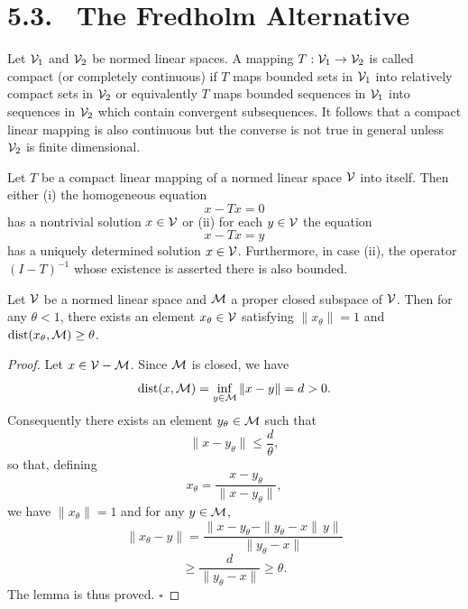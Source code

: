 \section*{5.3. \ The Fredholm Alternative}

\begin{definition}\label{gt.def5.3.compact-mapping}
Let $\mathcal{V}_1$ and $\mathcal{V}_2$ be normed linear spaces. A mapping $T : \mathcal{V}_1 \to \mathcal{V}_2$ is called compact (or completely continuous) if $T$ maps bounded sets in $\mathcal{V}_1$ into relatively compact sets in $\mathcal{V}_2$ or equivalently $T$ maps bounded sequences in $\mathcal{V}_1$ into sequences in $\mathcal{V}_2$ which contain convergent subsequences. It follows that a compact linear mapping is also continuous but the converse is not true in general unless $\mathcal{V}_2$ is finite dimensional.
\end{definition}

\begin{theorem}\label{gt.thm5.3}
Let $T$ be a compact linear mapping of a normed linear space $\mathcal{V}$ into itself. Then either (i) the homogeneous equation
\[
 x - Tx = 0
\]
has a nontrivial solution $x \in \mathcal{V}$ or (ii) for each $y \in \mathcal{V}$ the equation
\[
 x - Tx = y
\]
has a uniquely determined solution $x \in \mathcal{V}$. Furthermore, in case (ii), the operator $(I-T)^{-1}$ whose existence is asserted there is also bounded.
\end{theorem}

\begin{lemma}\label{gt.lem5.4}
Let $\mathcal{V}$ be a normed linear space and $\mathcal{M}$ a proper closed subspace of $\mathcal{V}$. Then for any $\theta < 1$, there exists an element $x_\theta \in \mathcal{V}$ satisfying $\|x_\theta\| = 1$ and $\operatorname{dist}(x_\theta, \mathcal{M}) \geq \theta$.
\end{lemma}

\begin{proof}
Let $x \in \mathcal{V} - \mathcal{M}$. Since $\mathcal{M}$ is closed, we have
\[
\operatorname{dist}(x, \mathcal{M}) = \inf_{y \in \mathcal{M}} \|x-y\| = d > 0.
\]
Consequently there exists an element $y_\theta \in \mathcal{M}$ such that
\[
\|x-y_\theta\| \leq \frac{d}{\theta},
\]
so that, defining
\[
 x_\theta = \frac{x-y_\theta}{\|x-y_\theta\|},
\]
we have $\|x_\theta\| = 1$ and for any $y \in \mathcal{M}$,
\[
\|x_\theta-y\| = \frac{\|x-y_\theta-\|y_\theta-x\|\,y\|}{\|y_\theta-x\|}
\]
\[
\geq \frac{d}{\|y_\theta-x\|} \geq \theta.
\]
The lemma is thus proved. $\square$
\end{proof}

